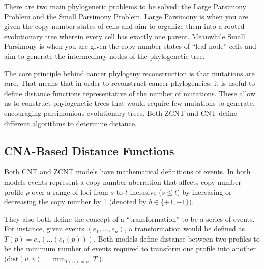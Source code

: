 
There are two main phylogenetic problems to be solved: the Large Parsimony Problem and the Small Parsimony Problem. Large Parsimony is when you are given the copy-number states of cells and aim to organize them into a rooted evolutionary tree wherein every cell has exactly one parent. Meanwhile Small Parsimony is when you are given the copy-number states of ``leaf-node'' cells and aim to generate the intermediary nodes of the phylogenetic tree. 

The core principle behind cancer phylogeny reconstruction is that mutations are rare. That means that in order to reconstruct cancer phylogeneies, it is useful to define distance functions representative of the number of mutations. These allow us to construct phylogenetic trees that would require few mutations to generate, encouraging parsimonious evolutionary trees. Both ZCNT and CNT define different algorithms to determine distance. 

\subsection{CNA-Based Distance Functions}

Both CNT and ZCNT models have mathematical definitions of events. In both models events represent a copy-number aberration that affects copy number profile $p$ over a range of loci from $s$ to $t$ inclusive ($s \leq t$) by increasing or decreasing the copy number by 1 (denoted by $b \in \{+1, -1\}$). 

They also both define the concept of a ``transformation'' to be a series of events. For instance, given events $(e_1, \hdots, e_n)$, a transformation would be defined as $T(p) = e_n(\hdots(e_1(p)))$. Both models define distance between two profiles to be the minimum number of events required to transform one profile into another ($\text{dist}(u, v) = \min_{T(u) = v} |T|$).

